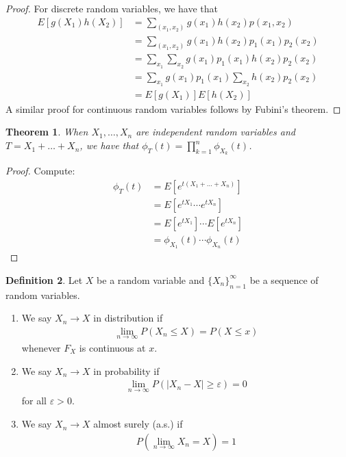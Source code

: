\documentclass[11pt]{amsart}
\newtheorem{theorem}{Theorem}[section]
\theoremstyle{definition}
\newtheorem{definition}[theorem]{Definition}
\numberwithin{equation}{section}
\begin{document}
\begin{proof}
    For discrete random variables, we have that
    \begin{align*}
        E[g(X_1)h(X_2)]&=\sum_{(x_1,x_2)}g(x_1)h(x_2)p(x_1,x_2)\\
        &=\sum_{(x_1,x_2)}g(x_1)h(x_2)p_1(x_1)p_2(x_2)\\
        &=\sum_{x_1}\sum_{x_2}g(x_1)p_1(x_1)h(x_2)p_2(x_2)\\
        &=\sum_{x_1}g(x_1)p_1(x_1)\sum_{x_2}h(x_2)p_2(x_2)\\
        &=E[g(X_1)]E[h(X_2)]
    \end{align*}
    A similar proof for continuous random variables follows by Fubini's theorem.
\end{proof}
\begin{theorem}
    When $X_1,\ldots,X_n$ are independent random variables and $T=X_1+\ldots+X_n$, we have that $\phi_T(t)=\prod_{k=1}^n\phi_{X_k}(t)$.
\end{theorem}
\begin{proof}
    Compute:
    \begin{align*}
        \phi_T(t)&=E[e^{t(X_1+\ldots+X_n)}]\\
        &=E[e^{tX_1}\cdots e^{tX_n}]\\
        &=E[e^{tX_1}]\cdots E[e^{tX_n}]\\
        &=\phi_{X_1}(t)\cdots\phi_{X_n}(t)
    \end{align*}
\end{proof}
\begin{definition}
    Let $X$ be a random variable and $\{X_n\}_{n=1}^\infty$ be a sequence of random variables. 
    \begin{enumerate}
        \item We say $X_n\to X$ in distribution if
        \begin{align*}
            \lim_{n\to\infty}P(X_n\le X)=P(X\le x)
        \end{align*}
        whenever $F_X$ is continuous at $x$.
        \item We say $X_n\to X$ in probability if
        \begin{align*}
            \lim_{n\to\infty}P(|X_n-X|\ge\varepsilon)=0
        \end{align*}
        for all $\varepsilon>0$.
        \item We say $X_n\to X$ almost surely (a.s.) if 
        \begin{align*}
            P(\lim_{n\to\infty}X_n=X)=1
        \end{align*}
    \end{enumerate}
\end{definition}
\end{document}
